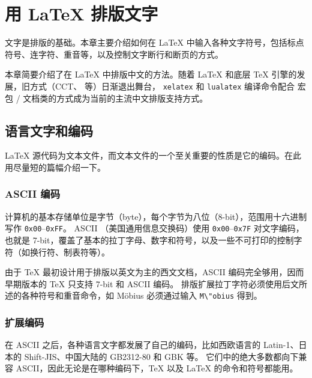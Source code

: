\chapter{用 \LaTeX{} 排版文字}\label{chap:text}

\begin{intro}
文字是排版的基础。本章主要介绍如何在 \LaTeX{} 中输入各种文字符号，包括标点符号、连字符、重音等，以及控制文字断行和断页的方式。

本章简要介绍了在 \LaTeX{} 中排版中文的方法。随着 \LaTeX{} 和底层 \TeX{} 引擎的发展，旧方式（CCT、 等）日渐退出舞台，
\texttt{xelatex} 和 \texttt{lualatex} 编译命令配合  宏包 / 文档类的方式成为当前的主流中文排版支持方式。
\end{intro}

\section{语言文字和编码}\label{sec:encoding}

\LaTeX{} 源代码为文本文件，而文本文件的一个至关重要的性质是它的编码。在此用尽量短的篇幅介绍一下。

\subsection{ASCII 编码}\label{subsec:ascii}

计算机的基本存储单位是字节（byte），每个字节为八位（8-bit），范围用十六进制写作 \texttt{0x00}--\texttt{0xFF}。
ASCII （美国通用信息交换码）使用 \texttt{0x00}--\texttt{0x7F} 对文字编码，也就是 7-bit，覆盖了基本的拉丁字母、数字和符号，以及一些不可打印的控制字符（如换行符、制表符等）。

由于 \TeX{} 最初设计用于排版以英文为主的西文文档，ASCII 编码完全够用，因而早期版本的 \TeX{} 只支持 7-bit 和 ASCII 编码。
排版扩展拉丁字符必须使用后文所述的各种符号和重音命令，如 M\"obius 必须通过输入 \verb|M\"obius| 得到。

\subsection{扩展编码}\label{subsec:ext-encoding}

在 ASCII 之后，各种语言文字都发展了自己的编码，比如西欧语言的 Latin-1、日本的 Shift-JIS、中国大陆的 GB2312-80 和 GBK 等。
它们中的绝大多数都向下兼容 ASCII，因此无论是在哪种编码下，\TeX{} 以及 \LaTeX{} 的命令和符号都能用。


